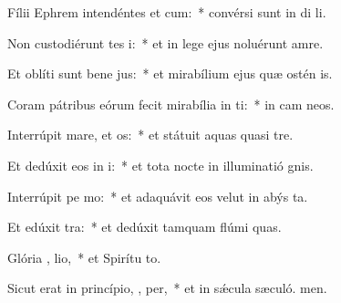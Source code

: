 \item Fílii Ephrem intendéntes et  cum:~* convérsi sunt in di li.
\item Non custodiérunt tes i:~* et in lege ejus noluérunt amre.
\item Et oblíti sunt bene jus:~* et mirabílium ejus quæ ostén is.
\item Coram pátribus eórum fecit mirabília in  ti:~* in cam neos.
\item Interrúpit mare, et  os:~* et státuit aquas quasi  tre.
\item Et dedúxit eos in  i:~* et tota nocte in illuminatió gnis.
\item Interrúpit pe  mo:~* et adaquávit eos velut in abýs ta.
\item Et edúxit   tra:~* et dedúxit tamquam flúmi quas.
\item Glória ,  lio,~* et Spirítu to.
\item Sicut erat in princípio,  ,  per,~* et in sǽcula sæculó. men.
